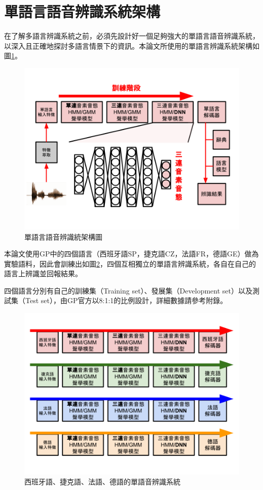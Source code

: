\section{單語言語音辨識系統架構}
在了解多語言辨識系統之前，必須先設計好一個足夠強大的單語言語音辨識系統，以深入且正確地探討多語言情景下的資訊。本論文所使用的單語言辨識系統架構如圖\ref{fig:chap3_framework}。
\begin{figure}[!h]
\centering
\includegraphics[scale=0.4]{images/chap3_framework.png}
\caption{單語言語音辨識統架構圖}
\label{fig:chap3_framework}
\end{figure}

本論文使用GP中的四個語言（西班牙語SP，捷克語CZ，法語FR，德語GE）做為實驗語料，因此會訓練出如圖\ref{fig:chap3_monolingual}，四個互相獨立的單語言辨識系統，各自在自己的語言上辨識並回報結果。

四個語言分別有自己的訓練集（Training set）、發展集（Development set）以及測試集（Test set），由GP官方以8:1:1的比例設計，詳細數據請參考附錄。

\begin{figure}[!h]
\centering
\includegraphics[scale=0.4]{images/chap3_monolingual.png}
\caption{西班牙語、捷克語、法語、德語的單語音辨識系統}
\label{fig:chap3_monolingual}
\end{figure}
